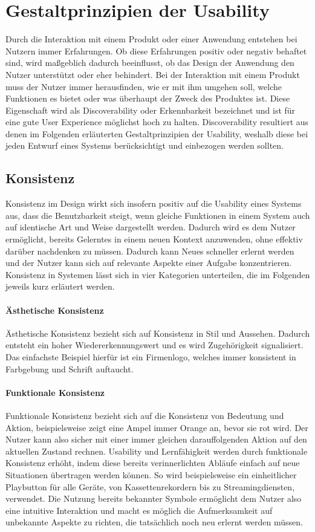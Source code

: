 \section{Gestaltprinzipien der Usability}
Durch die Interaktion mit einem Produkt oder einer Anwendung entstehen bei Nutzern immer Erfahrungen.
Ob diese Erfahrungen positiv oder negativ behaftet sind, wird maßgeblich dadurch beeinflusst, ob das Design der Anwendung den Nutzer unterstützt oder eher behindert.
Bei der Interaktion mit einem Produkt muss der Nutzer immer herausfinden, wie er mit ihm umgehen soll, welche Funktionen es bietet oder was überhaupt der Zweck des Produktes ist.
Diese Eigenschaft wird als Discoverability oder Erkennbarkeit bezeichnet und ist für eine gute User Experience möglichst hoch zu halten.
Discoverability resultiert aus denen im  Folgenden erläuterten Gestaltprinzipien der Usability, weshalb diese bei jeden Entwurf eines Systems berücksichtigt und einbezogen werden sollten\cite{Norman.2016}.

\subsection*{Konsistenz}
Konsistenz im Design wirkt sich insofern positiv auf die Usability eines Systems aus, dass die Benutzbarkeit steigt, wenn gleiche Funktionen in einem System auch auf identische Art und Weise dargestellt werden.
Dadurch wird es dem Nutzer ermöglicht, bereits Gelerntes in einem neuen Kontext anzuwenden, ohne effektiv darüber nachdenken zu müssen.
Dadurch kann Neues schneller erlernt werden und der Nutzer kann sich auf relevante Aspekte einer Aufgabe konzentrieren.
Konsistenz in Systemen lässt sich in vier Kategorien unterteilen, die im Folgenden jeweils kurz erläutert werden.

\paragraph{Ästhetische Konsistenz}
Ästhetische Konsistenz bezieht sich auf Konsistenz in Stil und Aussehen. Dadurch entsteht ein hoher Wiedererkennungswert und es wird Zugehörigkeit signalisiert. Das einfachste Beispiel hierfür ist ein Firmenlogo, welches immer konsistent in Farbgebung und Schrift auftaucht.

\paragraph{Funktionale Konsistenz}
Funktionale Konsistenz bezieht sich auf die Konsistenz von Bedeutung und Aktion, beispielsweise zeigt eine Ampel immer Orange an, bevor sie rot wird. Der Nutzer kann also sicher mit einer immer gleichen darauffolgenden Aktion auf den aktuellen Zustand rechnen. 
Usability und Lernfähigkeit werden durch funktionale Konsistenz erhöht, indem diese bereits verinnerlichten Abläufe einfach auf neue Situationen übertragen werden können. So wird beispielsweise ein einheitlicher Playbutton für alle Geräte, von Kassettenrekordern bis zu Streamingdiensten, verwendet.
Die Nutzung bereits bekannter Symbole ermöglicht dem Nutzer also eine intuitive Interaktion und macht es möglich die Aufmerksamkeit auf unbekannte Aspekte zu richten, die tatsächlich noch neu erlernt werden müssen.

